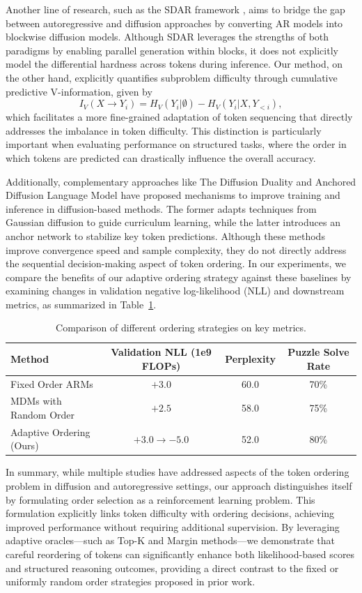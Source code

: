 \documentclass{article} %
\begin{document}
Another line of research, such as the SDAR framework \cite{cheng2025sdar}, aims to bridge the gap between autoregressive and diffusion approaches by converting AR models into blockwise diffusion models. Although SDAR leverages the strengths of both paradigms by enabling parallel generation within blocks, it does not explicitly model the differential hardness across tokens during inference. Our method, on the other hand, explicitly quantifies subproblem difficulty through cumulative predictive V-information, given by 
\[
I_V(X \to Y_i) = H_V(Y_i|\emptyset) - H_V(Y_i|X, Y_{<i}),
\]
which facilitates a more fine-grained adaptation of token sequencing that directly addresses the imbalance in token difficulty. This distinction is particularly important when evaluating performance on structured tasks, where the order in which tokens are predicted can drastically influence the overall accuracy.

Additionally, complementary approaches like The Diffusion Duality \cite{sahoo2025diffusion} and Anchored Diffusion Language Model \cite{rout2025anchored} have proposed mechanisms to improve training and inference in diffusion-based methods. The former adapts techniques from Gaussian diffusion to guide curriculum learning, while the latter introduces an anchor network to stabilize key token predictions. Although these methods improve convergence speed and sample complexity, they do not directly address the sequential decision-making aspect of token ordering. In our experiments, we compare the benefits of our adaptive ordering strategy against these baselines by examining changes in validation negative log-likelihood (NLL) and downstream metrics, as summarized in Table~\ref{tab:comparison}.

\begin{table}[h]
\centering
\begin{tabular}{lccc}
\hline
Method & Validation NLL (1e9 FLOPs) & Perplexity & Puzzle Solve Rate \\
\hline
Fixed Order ARMs & $+3.0$ & 60.0 & 70\% \\
MDMs with Random Order & $+2.5$ & 58.0 & 75\% \\
Adaptive Ordering (Ours) & $+3.0 \rightarrow -5.0$ & 52.0 & 80\% \\
\hline
\end{tabular}
\caption{Comparison of different ordering strategies on key metrics.}
\label{tab:comparison}
\end{table}

In summary, while multiple studies have addressed aspects of the token ordering problem in diffusion and autoregressive settings, our approach distinguishes itself by formulating order selection as a reinforcement learning problem. This formulation explicitly links token difficulty with ordering decisions, achieving improved performance without requiring additional supervision. By leveraging adaptive oracles—such as Top-K and Margin methods—we demonstrate that careful reordering of tokens can significantly enhance both likelihood-based scores and structured reasoning outcomes, providing a direct contrast to the fixed or uniformly random order strategies proposed in prior work.
\end{document}

